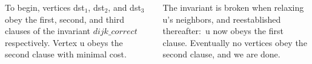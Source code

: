 \documentclass[a0paper, fleqn]{tikzposter}
\newcommand{\m}[1]{\ensuremath{\mathit{#1}}} %
\begin{document}
\begin{columns}
{{}%

\vspace{0.5em}

To begin, vertices dst$_1$, dst$_2$, and dst$_3$ obey the first, second, and third 
clauses of the invariant \m{dijk\_correct} respectively. Vertex u obeys the second clause with minimal cost. 

\vspace{0.5em}

The invariant is broken when relaxing u's neighbors, and reestablished thereafter:~u now obeys the first clause. Eventually no vertices obey the second clause, and we are done.
\vspace{-1.5em}
}%

\end{columns}
\end{document}
